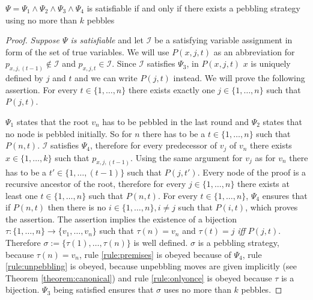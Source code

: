 \begin{theorem}

$\Psi = \Psi_1 \wedge \Psi_2 \wedge \Psi_3 \wedge \Psi_4$ is satisfiable if and only if there exists a pebbling strategy using no more than $k$ pebbles

\end{theorem}

\begin{proof}

\emph{Suppose $\Psi$ is satisfiable} and let $\mathcal{I}$ be a satisfying variable assignment in form of the set of true variables.
We will use $P(x,j,t)$ as an abbreviation for $p_{x,j,(t-1)} \notin \mathcal{I}$ and $p_{x,j,t} \in \mathcal{I}$.
Since $\mathcal{I}$ satisfies $\Psi_3$, in $P(x,j,t)$ $x$ is uniquely defined by $j$ and $t$ and we can write $P(j,t)$ instead.
We will prove the following assertion.
For every $t \in \{1,\ldots,n\}$ there exists exactly one $j \in \{1,\ldots,n\}$ such that $P(j,t)$.

$\Psi_1$ states that the root $v_n$ has to be pebbled in the last round and $\Psi_2$ states that no node is pebbled initially.
So for $n$ there has to be a $t \in \{1,\ldots,n\}$ such that $P(n,t)$.
$\mathcal{I}$ satisfies $\Psi_4$, therefore for every predecessor of $v_j$ of $v_n$ there exists $x \in \{1,\ldots,k\}$ such that $p_{x,j,(t-1)}$.
Using the same argument for $v_j$ as for $v_n$ there has to be a $t' \in \{1,\ldots,(t-1)\}$ such that $P(j,t')$.
Every node of the proof is a recursive ancestor of the root, therefore for every $j \in \{1,\ldots,n\}$ there exists at least one $t \in \{1,\ldots,n\}$ such that $P(n,t)$.
For every $t \in \{1,\ldots,n\}$, $\Psi_4$ ensures that if $P(n,t)$ then there is no $i \in \{1,\ldots,n\}, i \neq j$ such that $P(i,t)$, which proves the assertion.
The assertion implies the existence of a bijection $\tau : \{1,\ldots,n\} \rightarrow \{v_1,\ldots,v_n\}$ such that $\tau(n) = v_n$ and $\tau(t) = j$ \emph{iff} $P(j,t)$.
Therefore $\sigma := \{\tau(1),\ldots,\tau(n)\}$ is well defined.
$\sigma$ is a pebbling strategy, because $\tau(n) = v_n$, rule \ref{rule:premises} is obeyed because of $\Psi_4$, rule \ref{rule:unpebbling} is obeyed, because unpebbling moves are given implicitly (see Theorem \ref{theorem:canonical}) and rule \ref{rule:onlyonce} is obeyed because $\tau$ is a bijection.
$\Psi_3$ being satisfied ensures that $\sigma$ uses no more than $k$ pebbles.


\end{proof}
